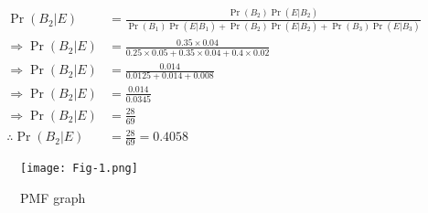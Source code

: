 \documentclass[journal,twocolumn]{IEEEtran}
\providecommand{\pr}[1]{\ensuremath{\Pr\left(#1\right)}}
\begin{document}
\begin{align}
\pr{B_2|E} &= \frac{\pr{B_2}\pr{E|B_2}}{\pr{B_1}\pr{E|B_1}+\pr{B_2}\pr{E|B_2}+\pr{B_3}\pr{E|B_3}} \\
\Rightarrow \pr{B_2|E} &= \frac{0.35 \times 0.04}{0.25 \times 0.05 + 0.35 \times 0.04 + 0.4 \times 0.02 } \\
\Rightarrow \pr{B_2|E} &= \frac{0.014}{0.0125+0.014+0.008} \\
\Rightarrow \pr{B_2|E} &= \frac{0.014}{0.0345} \\ 
\Rightarrow \pr{B_2|E} &= \frac{28}{69} \\ 
\therefore \pr{B_2|E} &= \frac{28}{69} = 0.4058 
\end{align}
\begin{figure}[h]
\texttt{[image: Fig-1.png]}
\caption{PMF graph}
\label{Fig 1}
\end{figure}
\end{document}
